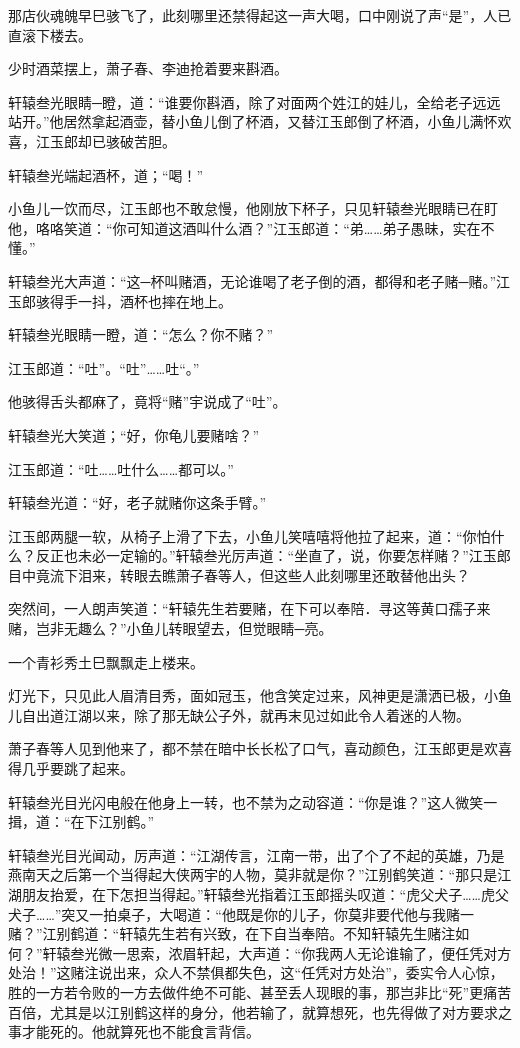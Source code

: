 \documentclass[12pt,oneside]{book}
\begin{document}
那店伙魂魄早巳骇飞了，此刻哪里还禁得起这一声大喝，口中刚说了声``是''，人已直滚下楼去。

少时酒菜摆上，萧子春、李迪抢着要来斟酒。

轩辕叁光眼睛─瞪，道：``谁要你斟酒，除了对面两个姓江的娃儿，全给老子远远站开。''他居然拿起酒壶，替小鱼儿倒了杯酒，又替江玉郎倒了杯酒，小鱼儿满怀欢喜，江玉郎却已骇破苦胆。

轩辕叁光端起酒杯，道；``喝！''

小鱼儿一饮而尽，江玉郎也不敢怠慢，他刚放下杯子，只见轩辕叁光眼睛已在盯他，咯咯笑道：``你可知道这酒叫什么酒？''江玉郎道：``弟\ldots\ldots 弟子愚昧，实在不懂。''

轩辕叁光大声道：``这─杯叫赌酒，无论谁喝了老子倒的酒，都得和老子赌─赌。''江玉郎骇得手一抖，酒杯也摔在地上。

轩辕叁光眼睛一瞪，道：``怎么？你不赌？''

江玉郎道：``吐''。``吐''\ldots\ldots 吐``。''

他骇得舌头都麻了，竟将``赌''宇说成了``吐''。

轩辕叁光大笑道；``好，你龟儿要赌啥？''

江玉郎道：``吐\ldots\ldots 吐什么\ldots\ldots 都可以。''

轩辕叁光道：``好，老子就赌你这条手臂。''

江玉郎两腿一软，从椅子上滑了下去，小鱼儿笑嘻嘻将他拉了起来，道：``你怕什么？反正也未必一定输的。''轩辕叁光厉声道：``坐直了，说，你要怎样赌？''江玉郎目中竟流下泪来，转眼去瞧萧子春等人，但这些人此刻哪里还敢替他出头？

突然间，一人朗声笑道：``轩辕先生若要赌，在下可以奉陪．寻这等黄口孺子来赌，岂非无趣么？''小鱼儿转眼望去，但觉眼睛─亮。

一个青衫秀土巳飘飘走上楼来。

灯光下，只见此人眉清目秀，面如冠玉，他含笑定过来，风神更是潇洒已极，小鱼儿自出道江湖以来，除了那无缺公子外，就再末见过如此令人着迷的人物。

萧子春等人见到他来了，都不禁在暗中长长松了口气，喜动颜色，江玉郎更是欢喜得几乎要跳了起来。

轩辕叁光目光闪电般在他身上一转，也不禁为之动容道：``你是谁？''这人微笑一揖，道：``在下江别鹤。''

轩辕叁光目光闻动，厉声道：``江湖传言，江南一带，出了个了不起的英雄，乃是燕南天之后第一个当得起大侠两宇的人物，莫非就是你？''江别鹤笑道：``那只是江湖朋友抬爱，在下怎担当得起。''轩辕叁光指着江玉郎摇头叹道：``虎父犬子\ldots\ldots 虎父犬子\ldots\ldots{}''突又一拍桌子，大喝道：``他既是你的儿子，你莫非要代他与我赌一赌？''江别鹤道：``轩辕先生若有兴致，在下自当奉陪。不知轩辕先生赌注如何？''轩辕叁光微一思索，浓眉轩起，大声道：``你我两人无论谁输了，便任凭对方处治！''这赌注说出来，众人不禁俱都失色，这``任凭对方处治''，委实令人心惊，胜的一方若令败的一方去做件绝不可能、甚至丢人现眼的事，那岂非比``死''更痛苦百倍，尤其是以江别鹤这样的身分，他若输了，就算想死，也先得做了对方要求之事才能死的。他就算死也不能食言背信。
\end{document}
